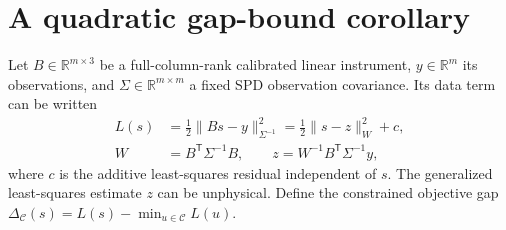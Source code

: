 \section{A quadratic gap-bound corollary}
\label{sec:gap}
Let $B\in\mathbb R^{m\times3}$ be a full-column-rank calibrated linear instrument, $y\in\mathbb R^m$ its observations, and $\Sigma\in\mathbb R^{m\times m}$ a fixed SPD observation covariance. Its data term can be written
\begin{equation}
 \begin{aligned}
 L(s)&=\tfrac12\|Bs-y\|_{\Sigma^{-1}}^2
       =\tfrac12\|s-z\|_W^2+c,\\
 W&=B^{\mathsf T}\Sigma^{-1}B,\qquad
 z=W^{-1}B^{\mathsf T}\Sigma^{-1}y,
 \end{aligned}
 \label{eq:calibrated}
\end{equation}
where $c$ is the additive least-squares residual independent of $s$. The generalized least-squares estimate $z$ can be unphysical. Define the constrained objective gap $\Delta_{\mathcal C}(s)=L(s)-\min_{u\in\mathcal C}L(u)$.

